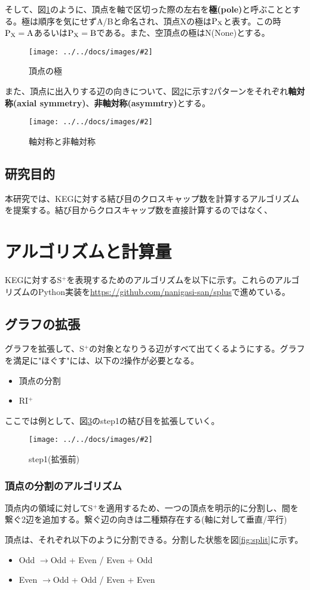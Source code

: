 \documentclass[11pt,a4j]{jarticle}
\newcommand{\splus}{S${}^\text{+}$}
\newcommand{\riplus}{RI${}^\text{+}$}
\newcommand{\f}[1]{$\rm{#1}$} %
\newcommand{\image}[4][height=100pt]{%
\begin{figure}[htbp]
    \centering
    \texttt{[image: ../../docs/images/\#2]}
    \caption{#3}
    \label{fig:#4}
\end{figure}%
}
\newcommand{\ra }{$\rightarrow$}
\begin{document}
そして、図\ref{fig:pole}のように、頂点を軸で区切った際の左右を\textbf{極(pole)}と呼ぶこととする。極は順序を気にせずA/Bと命名され、頂点Xの極は\f{P_X}と表す。この時\f{P_X=A}あるいは\f{P_X=B}である。また、空頂点の極はN(None)とする。
\image[height=200pt]{about_pole.jpg}{頂点の極}{pole}

また、頂点に出入りする辺の向きについて、図\ref{fig:axis}に示す2パターンをそれぞれ\textbf{軸対称(axial symmetry)}、\textbf{非軸対称(asymmtry)}とする。
\image{about_axis.jpg}{軸対称と非軸対称}{axis}

\subsection{研究目的}
本研究では、KEGに対する結び目のクロスキャップ数を計算するアルゴリズムを提案する。結び目からクロスキャップ数を直接計算するのではなく、

\section{アルゴリズムと計算量}
KEGに対する\splus を表現するためのアルゴリズムを以下に示す。これらのアルゴリズムのPython実装を\url{https://github.com/nanigasi-san/splus}で進めている。

\subsection{グラフの拡張}
グラフを拡張して、\splus の対象となりうる辺がすべて出てくるようにする。グラフを満足に"ほぐす"には、以下の2操作が必要となる。
\begin{itemize}
    \item 頂点の分割
    \item \riplus
\end{itemize}

ここでは例として、図\ref{fig:default}のstep1の結び目を拡張していく。
\image{extend_default.jpg}{step1(拡張前)}{default}

\subsubsection{頂点の分割のアルゴリズム}
頂点内の領域に対して\splus を適用するため、一つの頂点を明示的に分割し、間を繋ぐ2辺を追加する。繋ぐ辺の向きは二種類存在する(軸に対して垂直/平行)

頂点は、それぞれ以下のように分割できる。分割した状態を図\ref{fig:split}に示す。
\begin{itemize}
    \item Odd \ra  Odd + Even / Even + Odd
    \item Even \ra  Odd + Odd / Even + Even
\end{itemize}
\end{document}
